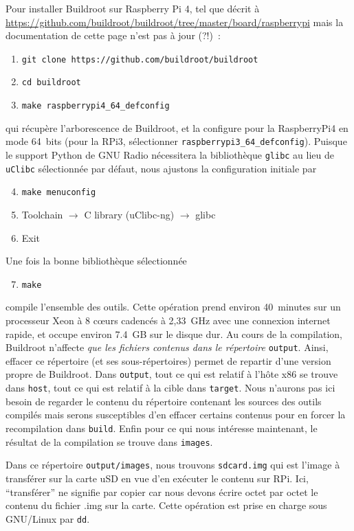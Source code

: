 \documentclass[a4paper]{article}
\begin{document}
Pour installer Buildroot sur Raspberry Pi 4, tel que d\'ecrit \`a 
\url{https://github.com/buildroot/buildroot/tree/master/board/raspberrypi} mais la
documentation de cette page n'est pas \`a jour (?!)~:
\begin{enumerate}
\item {\tt git clone https://github.com/buildroot/buildroot}
\item {\tt cd buildroot}
\item {\tt make raspberrypi4\_64\_defconfig}
\end{enumerate}
qui r\'ecup\`ere l'arborescence de Buildroot, et la configure pour la RaspberryPi4 en mode 64~bits (pour
la RPi3, s\'electionner {\tt raspberrypi3\_64\_defconfig}). Puisque le support Python de GNU Radio n\'ecessitera
la biblioth\`eque {\tt glibc} au lieu de {\tt uClibc} s\'electionn\'ee par d\'efaut, nous ajustons la
configuration initiale par
\begin{enumerate}
\setcounter{enumi}{3}
\item {\tt make menuconfig}
\item Toolchain $\rightarrow$ C library (uClibc-ng) $\rightarrow$ glibc
\item Exit
\end{enumerate}
Une fois la bonne biblioth\`eque s\'electionn\'ee
\begin{enumerate}
\setcounter{enumi}{6}
\item {\tt make}
\end{enumerate}
compile l'ensemble des outils. Cette op\'eration prend environ 40~minutes sur un processeur Xeon \`a 8 c\oe urs
cadenc\'es \`a 2,33~GHz avec une connexion internet rapide, et occupe environ 7.4~GB sur le disque dur. 
Au cours de la compilation, Buildroot n'affecte {\em que les fichiers contenus
dans le r\'epertoire} {\tt output}. Ainsi, effacer ce r\'epertoire (et ses sous-r\'epertoires)
permet de repartir d'une version propre de Buildroot. Dans {\tt output}, tout ce qui est
relatif \`a l'h\^ote x86 se trouve dans {\tt host}, tout ce qui est relatif \`a la cible dans
{\tt target}. Nous n'aurons pas ici besoin de regarder le contenu du r\'epertoire contenant
les sources des outils compil\'es mais serons susceptibles d'en effacer certains contenus pour
en forcer la recompilation dans {\tt build}. Enfin pour ce qui nous int\'eresse maintenant,
le r\'esultat de la compilation se trouve dans {\tt images}.

Dans ce r\'epertoire {\tt output/images}, nous trouvons {\tt sdcard.img} qui est l'image
\`a transf\'erer sur la carte uSD en vue d'en ex\'ecuter le contenu sur RPi. Ici,
``transf\'erer'' ne signifie par copier car nous devons \'ecrire octet par octet le
contenu du fichier .img sur la carte. Cette op\'eration est prise en charge sous GNU/Linux
par {\tt dd}.
\end{document}
